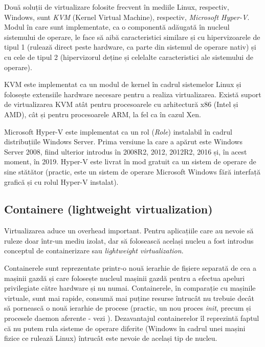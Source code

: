 Două soluții de virtualizare folosite frecvent în mediile Linux,
respectiv, Windows, sunt \textit{KVM}  (Kernel Virtual Machine), respectiv, \textit{Microsoft Hyper-V}.
Modul în care sunt implementate, ca o componentă adăugată în nucleul
sistemului de operare, le face să aibă caracteristici similare și cu
hipervizoarele de tipul 1 (rulează direct peste hardware, ca parte din
sistemul de operare nativ) și cu cele de tipul 2 (hipervizorul deține și celelalte caracteristici ale sistemului de operare).

KVM este implementat ca un modul de kernel în cadrul sistemelor Linux și
folosește extensiile hardware necesare pentru a realiza virtualizarea.
Există suport de virtualizarea KVM atât pentru procesoarele cu
arhitectură x86 (Intel și AMD), cât și pentru procesoarele ARM, la fel ca în cazul Xen.

Microsoft Hyper-V este implementat ca un rol (\textit{Role}) instalabil în cadrul distribuțiile Windows Server.
Prima versiune la care a apărut este Windows Server 2008, fiind ulterior
introdus în 2008R2, 2012, 2012R2, 2016 și, în acest moment, în 2019.
Hyper-V este livrat în mod gratuit ca un sistem de operare de sine
stătător (practic, este un sistem de operare Microsoft Windows fără interfață grafică și cu rolul Hyper-V instalat).

\subsection{Containere (lightweight virtualization)}
\label{sec:vm:concepts:containers}

Virtualizarea aduce un overhead important. Pentru aplicațiile care au nevoie să
ruleze doar într-un mediu izolat, dar să folosească același nucleu a
fost introdus conceptul de containerizare sau \textit{lightweight
virtualization}.

Containerele sunt reprezentate printr-o nouă ierarhie de
fișiere separată de cea a mașinii gazdă și care folosește nucleul
mașinii gazdă pentru a efectua apeluri privilegiate către hardware și nu numai.
Containerele, în comparație cu mașinile virtuale, sunt mai rapide, consumă mai
puține resurse întrucât nu trebuie decât să pornească o nouă ierarhie de procese
(practic, un nou proces \textit{init}, precum și procesele daemon aferente - vezi
). Dezavantajul containerelor îl
reprezintă faptul că nu putem rula sisteme de operare diferite (Windows în
cadrul unei mașini fizice ce rulează Linux) întrucât este nevoie de același tip
de nucleu.

